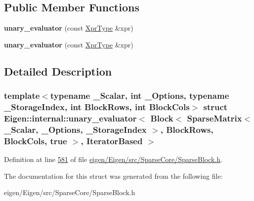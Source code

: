 \subsection*{Public Member Functions}
\begin{DoxyCompactItemize}
\item 
\mbox{\label{struct_eigen_1_1internal_1_1unary__evaluator_3_01_block_3_01_sparse_matrix_3_01___scalar_00_01__bc162881393553b921ff4fd46550ce3d_a1e0c1698ff67d0d184113a085bfce4db}} 
{\bfseries unary\+\_\+evaluator} (const \hyperlink{group___core___module_class_eigen_1_1_block}{Xpr\+Type} \&xpr)
\item 
\mbox{\label{struct_eigen_1_1internal_1_1unary__evaluator_3_01_block_3_01_sparse_matrix_3_01___scalar_00_01__bc162881393553b921ff4fd46550ce3d_a1e0c1698ff67d0d184113a085bfce4db}} 
{\bfseries unary\+\_\+evaluator} (const \hyperlink{group___core___module_class_eigen_1_1_block}{Xpr\+Type} \&xpr)
\end{DoxyCompactItemize}


\subsection{Detailed Description}
\subsubsection*{template$<$typename \+\_\+\+Scalar, int \+\_\+\+Options, typename \+\_\+\+Storage\+Index, int Block\+Rows, int Block\+Cols$>$\newline
struct Eigen\+::internal\+::unary\+\_\+evaluator$<$ Block$<$ Sparse\+Matrix$<$ \+\_\+\+Scalar, \+\_\+\+Options, \+\_\+\+Storage\+Index $>$, Block\+Rows, Block\+Cols, true $>$, Iterator\+Based $>$}



Definition at line \hyperlink{eigen_2_eigen_2src_2_sparse_core_2_sparse_block_8h_source_l00581}{581} of file \hyperlink{eigen_2_eigen_2src_2_sparse_core_2_sparse_block_8h_source}{eigen/\+Eigen/src/\+Sparse\+Core/\+Sparse\+Block.\+h}.



The documentation for this struct was generated from the following file\+:\begin{DoxyCompactItemize}
\item 
eigen/\+Eigen/src/\+Sparse\+Core/\+Sparse\+Block.\+h\end{DoxyCompactItemize}
